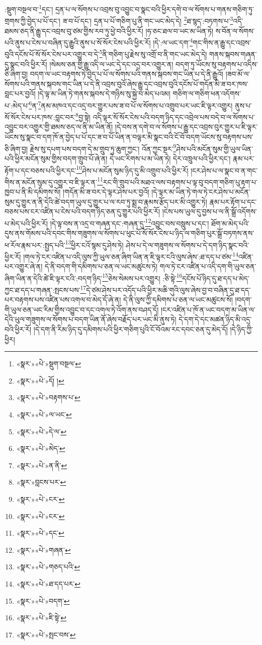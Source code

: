 :སྡུག་བསྔལ་བ་\footnote{«སྣར་»«པེ་»སྡུག་བསྔལ་}དང་། དྲན་པ་ལ་སོགས་པ་འབྲས་བུ་འབྱུང་བ་སྣང་བའི་ཕྱིར་དགེ་བ་ལ་སོགས་པ་གནས་གཅིག་ཏུ་གྲགས་ཀྱི་བྱེད་པ་པོ་དང་། ཟ་བ་པོ་དང་། དྲན་པ་པོ་གཅིག་པུ་ནི་གང་ཡང་མེད་དེ། \footnote{«སྣར་»«པེ་»དོ། ། }ཐ་སྙད་:བཏགས་པ་\footnote{«སྣར་»«པེ་»བརྟགས་པ་}འདི་ཐམས་ཅད་ནི་རྒྱུ་དང་འབྲས་བུ་ཙམ་གྱིས་རབ་ཏུ་ཕྱེ་བའི་ཕྱིར་རོ། །ཧ་ཅང་ཐལ་བ་ཡང་མ་ཡིན་ཏེ། ས་བོན་ལ་སོགས་པའི་ནུས་པ་ངེས་པ་བཞིན་དུ་རྒྱུའི་ནུས་པ་སོ་སོར་ངེས་པའི་ཕྱིར་རོ། །དེ་:ལ་ཡང་དག་\footnote{«སྣར་»«པེ་»ལ་ཡང་}གང་གིས་ན་རྒྱུ་དང་འབྲས་བུའི་དངོས་པོ་སོ་སོར་ངེས་པར་འགྱུར་བ་དེ་\footnote{«སྣར་»«པེ་»དེ་ལ་}ནི་གཅིག་པུ་རྗེས་སུ་འགྲོ་བ་ནི་གང་ཡང་མེད་དེ། གནས་སྐབས་གཞན་དུ་སྣང་བའི་ཕྱིར་རོ། །སེམས་ཅན་གྱི་རྒྱུ་འདི་ལ་ཡང་དེ་དང་འདྲ་བར་འགྱུར་ན། བདག་ཏུ་ཡོངས་སུ་བརྟགས་པ་འདིས་ཅི་ཞིག་བྱ། བདག་ལ་ཡང་བརྟགས་ཏེ་བྱེད་པ་པོ་ལ་སོགས་པའི་གནས་སྐབས་གང་ཡིན་པ་དེ་ནི་རྒྱུའོ། །ཟབ་མོ་ལ་སོགས་པའི་གནས་སྐབས་གང་ཡིན་པ་དེ་ནི་འབྲས་བུའོ་ཞེས་རྒྱུ་དང་འབྲས་བུའི་དངོས་པོ་གདོན་མི་ཟ་བར་ཁས་བླང་པར་བྱའོ། །དེ་ལྟ་མ་ཡིན་ཏེ་གནས་སྐབས་དེ་གཉིས་སུ་སྐྱེ་བ་མེད་པའམ། གཅིག་ལ་གཅིག་ཕན་འདོགས་པ་:མེད་པ་\footnote{«སྣར་»«པེ་»མེད་}ན་\footnote{«སྣར་»«པེ་»ན་ནི་}ནམ་མཁའ་དང་འདྲ་བར་གྱུར་པས་ཟ་བ་པོ་ལ་སོགས་པ་འགྲུབ་པར་ཡང་ཇི་ལྟར་འགྱུར། ནུས་པ་སོ་སོར་ངེས་པར་ཁས་:བླང་བར་\footnote{«སྣར་»བླངས་པར་}བྱ་སྟེ། འདི་ལྟར་སོ་སོར་ངེས་པའི་བདག་ཉིད་དང་འབྲེལ་པས་བདེ་བ་ལ་སོགས་པ་འབྱུང་བར་འགྱུར་གྱི་ཐམས་ཅད་ལ་ནི་མ་ཡིན་ནོ། །དེ་བས་ན་དགེ་བ་ལ་སོགས་པ་རྒྱུ་དང་འབྲས་བུར་གྱུར་པ་ཇི་ལྟར་ཡོངས་སུ་སྣང་བ་དག་ཁོ་ན་བྱེད་པ་པོ་དང་ཟ་བ་པོ་ཡིན་ན་བལྟར་མི་སྣང་བའི་ངོ་བོ་བདག་ཡོངས་སུ་བརྟགས་པས་ཅི་ཞིག་བྱ། རྗེས་སུ་དཔག་པས་བདག་དེ་མ་གྲུབ་ཏུ་ཆུག་ཀྱང་། འོན་ཀྱང་སྔར་\footnote{«སྣར་»«པེ་»ངར་}ཤེས་པའི་མངོན་སུམ་གྱི་ཡུལ་ཡིན་པའི་ཕྱིར་མངོན་སུམ་གྱིས་བདག་གྲུབ་པོ་ཞེ་ན། དེ་ཡང་རིགས་པ་མ་ཡིན་ཏེ། དེར་འཁྲུལ་པའི་ཕྱིར་དང་། རྣམ་པར་རྟོག་པ་དང་བཅས་པའི་ཕྱིར་དང་\footnote{«སྣར་»«པེ་»ངར་}ཤེས་པ་མངོན་སུམ་ཉིད་དུ་མི་འགྲུབ་པའི་ཕྱིར་རོ། །ངར་ཤེས་པ་ལ་སྣང་བ་ན་གང་གིས་ན་མངོན་སུམ་དུ་འགྱུར་བ་ཇི་ལྟར་ན་\footnote{«སྣར་»«པེ་»དང་}རང་གི་གྲུབ་པའི་མཐའ་ལས་བརྟགས་པ་ལྟ་བུ་བདག་གཅིག་པུ་རྟག་པ་ཁྱབ་པ་ནི་མི་དམིགས་སོ། །གདོན་མི་ཟ་བར་དེ་ལྟར་ཤེས་པར་བྱའོ། །དེ་ལྟར་མ་ཡིན་ཏེ་གལ་ཏེ་ངར་ཤེས་པ་མངོན་སུམ་དུ་གྱུར་ན་ནི་དེའི་ཚེ་བདག་ཡུལ་དུ་གྱུར་པ་ལ་རབ་ཏུ་སྨྲ་བ་རྣམས་རྩོད་པར་མི་འགྱུར་ཏེ། རྣམ་པར་རྟོག་པ་དང་བཅས་པས་ངར་འཛིན་པ་ངེས་པའི་བདག་ཉིད་ཅན་དུ་གྱུར་པའི་ཕྱིར་རོ། །ངེས་པས་ཡུལ་དུ་བྱས་པ་ལ་ནི་སྒྲོ་འདོགས་པ་མེད་པའི་ཕྱིར་རོ། །དེ་ལྟ་བས་ན་འདྲ་བ་གཞན་དང་:གཞན་དུ་\footnote{«སྣར་»«པེ་»གཞན་}འབྱུང་བས་བསླུས་པ་དང་། ཐོག་མ་མེད་པའི་དུས་ནས་གོམས་པའི་དབང་གིས་གཟུགས་ལ་སོགས་པ་ཕུང་པོ་སོ་སོར་ངེས་པ་ཉིད་ལ་གཅིག་པུར་སྒྲོ་བཏགས་ནས་ཕ་རོལ་རྣམ་པར་:སྤྱད་པའི་\footnote{«སྣར་»«པེ་»གཅད་པའི་}ཕྱིར་ངའོ་སྙམ་དུ་ཤེས་ཏེ། ཤེས་པ་དེ་ལ་གཟུགས་ལ་སོགས་པ་དེ་དག་ཉིད་སྣང་བའི་ཕྱིར་རོ། །གལ་ཏེ་ངར་འཛིན་པ་འདི་ལུས་ཀྱི་ཡུལ་ཅན་ཞིག་ཡིན་ན་ཇི་ལྟར་ངའི་ལུས་ཞེས་:ཐ་དད་པ་ཙམ་\footnote{«སྣར་»«པེ་»ཐ་དད་པར་}འཛིན་པར་འགྱུར་ཞེ་ན། དེ་ནི་བདག་གི་དམིགས་པ་ཅན་ལ་ཡང་མཚུངས་ཏེ། གལ་ཏེ་ངར་འཛིན་པ་འདི་དག་གི་ཡུལ་ཅན་ཞིག་ཡིན་ན་དེའི་ཚེ་ཇི་ལྟར་ངའི་:བདག་ཉིད་\footnote{«སྣར་»«པེ་»བདག་}ཅེས་སེམས་པར་འགྱུར། :ཅི་སྟེ་\footnote{«སྣར་»«པེ་»ཇི་སྟེ་}དངོས་པོ་ཉིད་དུ་ཐ་དད་པ་མེད་ཀྱང་ཐ་དད་པ་གཞན་:སྤངས་པས་\footnote{«སྣར་»«པེ་»སྤང་བས་}དེ་ཙམ་ཤེས་པར་འདོད་པའི་ཕྱིར་མཆི་གུའི་ལུས་ཞེས་བྱ་བ་བཞིན་དུ་ཐ་དད་པར་བརྟགས་པས་འཛིན་པས་འགལ་བ་མེད་དོ་ཞེ་ན། དེ་ནི་ལུས་ཀྱི་དམིགས་པ་ཅན་ལ་ཡང་མཚུངས་སོ། །བདག་གི་ཡུལ་ཅན་ཡང་རིམ་གྱིས་འབྱུང་བ་དང་འགལ་ཏེ་འོག་ནས་བཤད་དོ། །ངར་འཛིན་པ་ཁོ་ན་ཡང་བདག་མ་ཡིན་ལ་དེའི་ཡུལ་གཟུགས་ལ་སོགས་པ་བདག་ཡིན་ནོ་ཞེས་བརྗོད་པར་ཡང་མི་ནུས་ཏེ། དེ་དག་དེ་དང་མཚན་ཉིད་མི་འདྲ་བའི་ཕྱིར་རོ། །དེ་དག་ནི་རིམ་ཉིད་དུ་དམིགས་པའི་ཕྱིར་གཅིག་པུའི་ངོ་བོའམ་རང་དབང་ཅན་དུ་མེད་དོ། །དེ་ཉིད་ཀྱི་ཕྱིར། 